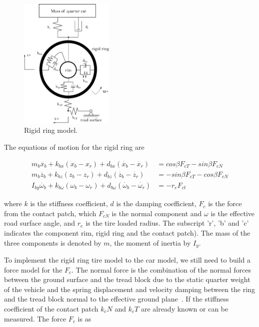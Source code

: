  \begin{figure}
 \centering
 \includegraphics[width=0.4\textwidth]{bilder/rrm.png}
 \caption{Rigid ring model.}
 \label{fig:rrm}
 \end{figure}

The equations of motion for the rigid ring are

\begin{align}
\label{equ:rr}
m_b\ddot{x_b}+k_{bx}(x_b-x_r)+d_{bx}(\dot{x_b}-\dot{x_r}) &= cos\beta F_{cT}-sin\beta F_{cN} \\
m_b\ddot{z_b}+k_{bz}(z_b-z_r)+d_{bz}(\dot{z_b}-\dot{z_r}) &= -sin\beta F_{cT}-cos\beta F_{cN}\\
I_{by}\ddot{\omega_b}+k_{b\omega}(\omega_b-\omega_r)+d_{b\omega}(\dot{\omega_b}-\dot{\omega_r}) &=-r_eF_{ct}
\end{align}

where $k$ is the stiffness coefficient, $d$ is the damping coefficient, $F_{c}$ is the force from the contact patch, which $F_{cN}$ is the normal component and %
%
$\omega$ is the effective road surface angle, and $r_e$ is the tire loaded radius.
%
The subscript 'r', 'b' and 'c' indicates the component rim, rigid ring and the contact patch).
%
The mass of the three components is denoted by $m$, the moment of inertia by $I_y$.

To implement the rigid ring tire model to the car model, we still need to build a force model for the $F_c$.
%
The normal force is the combination of the normal forces between the ground surface and the tread block due to the static quarter weight of the vehicle and the spring displacement and velocity damping between the ring and the tread block normal to the effective ground plane~\cite{na2016rigid}.
%
If the stiffness coefficient of the contact patch $k_cN$ and $k_cT$ are already known or can be measured.
%
The force $F_c$ is as

